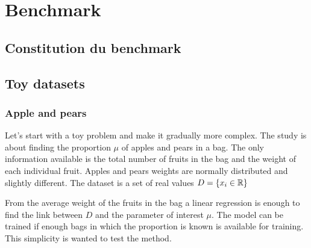 
\chapter{Benchmark}
\label{chap:benchmark}
\ifpdf
    \graphicspath{{Chapter4/Figs/Raster/}{Chapter4/Figs/PDF/}{Chapter4/Figs/}}
\else
    \graphicspath{{Chapter4/Figs/Vector/}{Chapter4/Figs/}}
\fi


\section{Constitution du benchmark} %
\label{sec:constitution_du_benchmark}




\section{Toy datasets} %
\label{sec:toy_datasets}




\subsection{Apple and pears} %
\label{sub:apple_and_pears}

Let's start with a toy problem and make it gradually more complex.
The study is about finding the proportion $\mu$ of apples and pears in a bag.
The only information available is the total number of fruits in the bag and the weight of each individual fruit.
Apples and pears weights are normally distributed and slightly different.
The dataset is a set of real values $D = \{ x_i \in \mathbb{R} \} $

From the average weight of the fruits in the bag a linear regression is enough to find the link between $D$ and the parameter of interest $\mu$.
The model can be trained if enough bags in which the proportion is known is available for training.
This simplicity is wanted to test the method.

